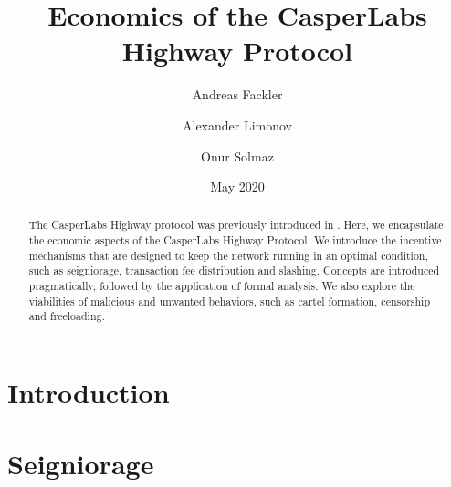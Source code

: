 \documentclass[12pt]{article}
\title{Economics of the CasperLabs Highway Protocol}
\author[*]{Andreas Fackler}
\author[*]{Alexander Limonov}
\author[*]{Onur Solmaz}
\affil[*]{CasperLabs}
\date{May 2020}
\begin{document}
\maketitle
\tableofcontents
\pagebreak


\begin{abstract}
  The CasperLabs Highway protocol was previously introduced in \cite{kane2019casperlabs}. Here, we encapsulate the economic aspects of the CasperLabs Highway Protocol. We introduce the incentive mechanisms that are designed to keep the network running in an optimal condition, such as seigniorage, transaction fee distribution and slashing. Concepts are introduced pragmatically, followed by the application of formal analysis. We also explore the viabilities of malicious and unwanted behaviors, such as cartel formation, censorship and freeloading.
\end{abstract}


\section*{Introduction}

\section*{Seigniorage}


\newpage

\printbibliography
\end{document}
